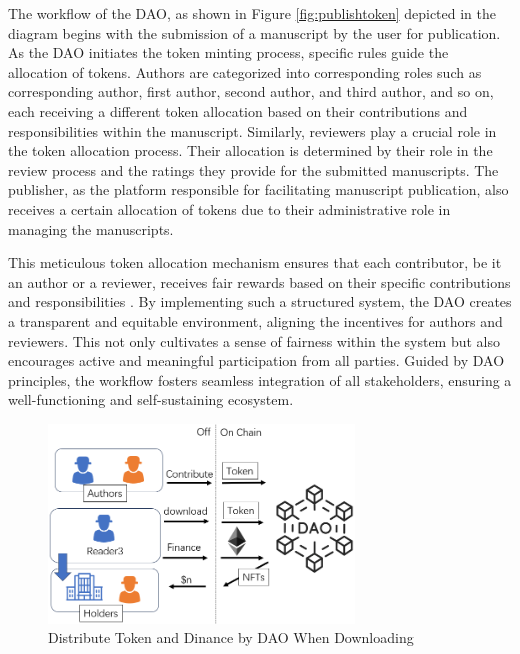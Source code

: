 \documentclass[lettersize,journal]{IEEEtran}
\begin{document}
The workflow of the DAO, as shown in Figure \ref{fig:publishtoken} depicted in the diagram begins with the submission of a manuscript by the user for publication. As the DAO initiates the token minting process, specific rules guide the allocation of tokens. Authors are categorized into corresponding roles such as corresponding author, first author, second author, and third author, and so on, each receiving a different token allocation based on their contributions and responsibilities within the manuscript. Similarly, reviewers play a crucial role in the token allocation process. Their allocation is determined by their role in the review process and the ratings they provide for the submitted manuscripts. The publisher, as the platform responsible for facilitating manuscript publication, also receives a certain allocation of tokens due to their administrative role in managing the manuscripts. 

This meticulous token allocation mechanism ensures that each contributor, be it an author or a reviewer, receives fair rewards based on their specific contributions and responsibilities \cite{10123021}. By implementing such a structured system, the DAO creates a transparent and equitable environment, aligning the incentives for authors and reviewers. This not only cultivates a sense of fairness within the system but also encourages active and meaningful participation from all parties. Guided by DAO principles, the workflow fosters seamless integration of all stakeholders, ensuring a well-functioning and self-sustaining ecosystem.



\begin{figure}[h!]
  \centering
  \includegraphics[width=3.2in]{assets/downloadfinance.png}
  \caption{Distribute Token and Dinance by DAO When Downloading}
  \label{fig:downloadfinance}
\end{figure}
\end{document}
